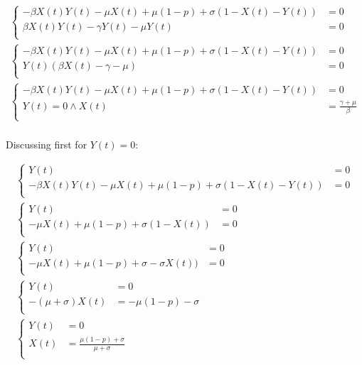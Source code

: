   \begin{align*}
    \begin{cases}
      -\beta X(t)Y(t) - \mu X(t) + \mu (1-p) + \sigma (1 - X(t) - Y(t)) &= 0\\
      \beta X(t)Y(t) - \gamma Y(t) - \mu Y(t) &= 0\\
    \end{cases}\\
    \begin{cases}
      -\beta X(t)Y(t) - \mu X(t) + \mu (1-p) + \sigma (1 - X(t) - Y(t)) &= 0\\
      Y(t)(\beta X(t) - \gamma - \mu) &= 0\\
    \end{cases}\\
    \begin{cases}
      -\beta X(t)Y(t) - \mu X(t) + \mu (1-p) + \sigma (1 - X(t) - Y(t)) &= 0\\
      Y(t) = 0 \land X(t) &= \frac{\gamma+\mu}{\beta}\\
    \end{cases}\\
  \end{align*}

  Discussing first for $Y(t) = 0$:

  \begin{align*}
    \begin{cases}
      Y(t) &= 0\\
      -\beta X(t)Y(t) - \mu X(t) + \mu (1-p) + \sigma (1 - X(t) - Y(t)) &= 0\\
    \end{cases}\\
    \begin{cases}
      Y(t) &= 0\\
      - \mu X(t) + \mu (1-p) + \sigma (1 - X(t)) &= 0\\
    \end{cases}\\
    \begin{cases}
      Y(t) &= 0\\
      - \mu X(t) + \mu (1-p) + \sigma - \sigma X(t)) &= 0\\
    \end{cases}\\
    \begin{cases}
      Y(t) &= 0\\
      -(\mu +\sigma)X(t) &=- \mu (1-p) - \sigma\\
    \end{cases}\\
    \begin{cases}
      Y(t) &= 0\\
      X(t) &= \frac{\mu (1-p) + \sigma}{\mu+\sigma}\\
    \end{cases}\\
  \end{align*}

